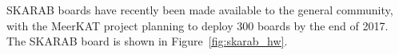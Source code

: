 \documentclass{ws-jai}
\begin{document}
% 
SKARAB boards have recently been made available to the general community, with the MeerKAT project planning to deploy 300 boards by the end of 2017. The SKARAB board is shown in Figure~\ref{fig:skarab_hw}.
\end{document}
